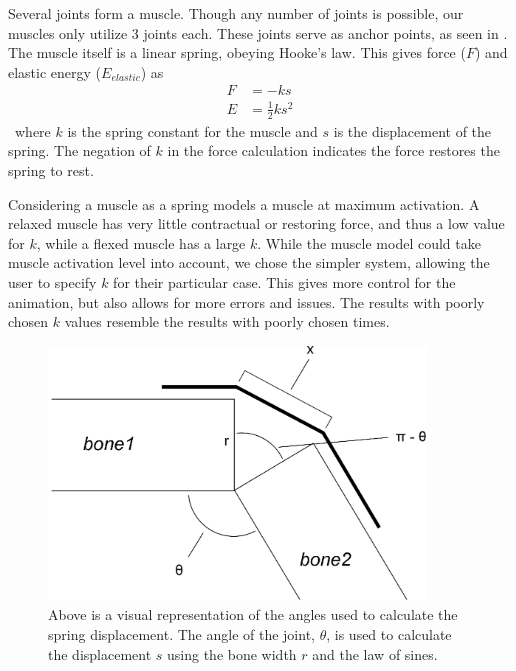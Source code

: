 Several joints form a muscle.  Though any number of joints is possible, our muscles only utilize 3 joints each.  These joints serve as anchor points, as seen in \cite{muscle_based_bipeds}.  The muscle itself is a linear spring, obeying Hooke's law.  This gives force ($F$) and elastic energy ($E_{elastic}$) as
\begin{align*}
	F &= -ks \\
	E &= \frac{1}{2} k s^2
\end{align*}\
where $k$ is the spring constant for the muscle and $s$ is the displacement of the spring.  The negation of $k$ in the force calculation indicates the force restores the spring to rest.

Considering a muscle as a spring models a muscle at maximum activation.  A relaxed muscle has very little contractual or restoring force, and thus a low value for $k$, while a flexed muscle has a large $k$.  While the muscle model could take muscle activation level into account, we chose the simpler system, allowing the user to specify $k$ for their particular case.  This gives more control for the animation, but also allows for more errors and issues.  The results with poorly chosen $k$ values resemble the results with poorly chosen times.

\begin{figure}[ht]
	\centering
	\includegraphics[width=10cm]{images/spring_calc/angle_diag.eps}
	\caption[Diagram of spring displacement calculation]{Above is a visual representation of the angles used to calculate the spring displacement.  The angle of the joint, $\theta$, is used to calculate the displacement $s$ using the bone width $r$ and the law of sines.}
	\label{fig:angleDiag}
\end{figure}

